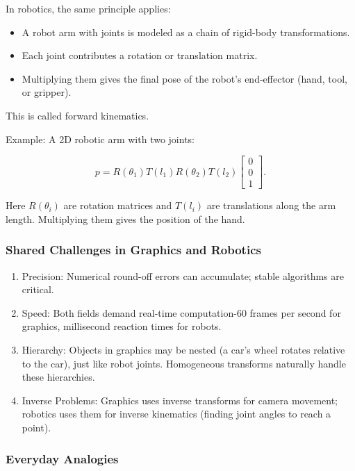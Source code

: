 \documentclass[
  letterpaper,
  DIV=11,
  numbers=noendperiod]{scrreprt}
\providecommand{\tightlist}{%
  \setlength{\itemsep}{0pt}\setlength{\parskip}{0pt}}
\begin{document}
In robotics, the same principle applies:

\begin{itemize}
\tightlist
\item
  A robot arm with joints is modeled as a chain of rigid-body
  transformations.
\item
  Each joint contributes a rotation or translation matrix.
\item
  Multiplying them gives the final pose of the robot's end-effector
  (hand, tool, or gripper).
\end{itemize}

This is called forward kinematics.

Example: A 2D robotic arm with two joints:

\[
p = R(\theta_1) T(l_1) R(\theta_2) T(l_2) \begin{bmatrix} 0 \\ 0 \\ 1 \end{bmatrix}.
\]

Here \(R(\theta_i)\) are rotation matrices and \(T(l_i)\) are
translations along the arm length. Multiplying them gives the position
of the hand.

\subsubsection{Shared Challenges in Graphics and
Robotics}\label{shared-challenges-in-graphics-and-robotics}

\begin{enumerate}
\def\labelenumi{\arabic{enumi}.}
\tightlist
\item
  Precision: Numerical round-off errors can accumulate; stable
  algorithms are critical.
\item
  Speed: Both fields demand real-time computation-60 frames per second
  for graphics, millisecond reaction times for robots.
\item
  Hierarchy: Objects in graphics may be nested (a car's wheel rotates
  relative to the car), just like robot joints. Homogeneous transforms
  naturally handle these hierarchies.
\item
  Inverse Problems: Graphics uses inverse transforms for camera
  movement; robotics uses them for inverse kinematics (finding joint
  angles to reach a point).
\end{enumerate}

\subsubsection{Everyday Analogies}\label{everyday-analogies-87}
\end{document}
